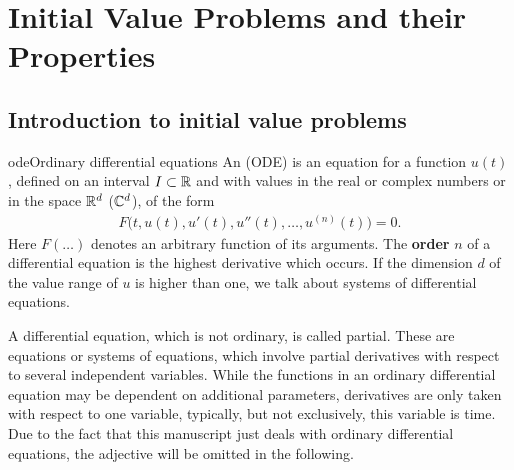 \chapter{Initial Value Problems and their Properties}
\label{cha:IVP}

\section{Introduction to initial value problems}


\begin{Definition*}{ode}{Ordinary differential equations} \label{Definition:IVP}
    An  (ODE) is an equation for a function $u(t)$, defined on
  an interval $I \subset \mathbb R$ and with values in the real or complex
  numbers or in the space $\mathbb R^d$ ($\mathbb C^d$), of the form
  \begin{gather}
    F\bigl(t, u(t), u'(t), u''(t), \dots, u^{(n)}(t)\bigr) = 0.
  \end{gather}
  Here $F(\ldots)$ denotes an arbitrary function of its arguments.
  The \textbf{order} $n$ of
  a differential equation is the highest derivative which occurs.  If
  the dimension $d$ of the value range of $u$ is higher than one, we
  talk about systems of differential equations.
\end{Definition*}

\begin{remark}
  A differential equation, which is not ordinary, is called partial.
  These are equations or systems of equations, which involve partial
  derivatives with respect to several independent variables.  While
  the functions in an ordinary differential equation may be dependent
  on additional parameters, derivatives are only taken with respect to
  one variable, typically, but not exclusively, this variable is
  time. Due to the fact that this manuscript just deals with ordinary
  differential equations, the adjective will be omitted in the
  following.
\end{remark}

